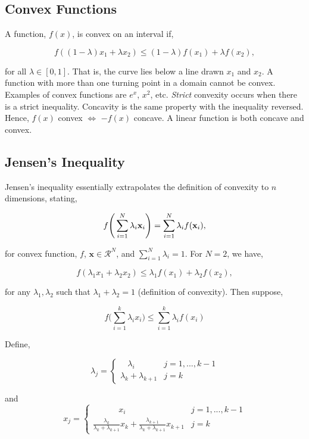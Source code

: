 \documentclass[11pt]{amsart}
\begin{document}
\subsection{Convex Functions}

A function, $f(x)$, is convex on an interval if,

$$
f((1 - \lambda)x_1 + \lambda x_2) \leq (1 - \lambda) f(x_1) + \lambda f(x_2),
$$

for all $\lambda \in [0, 1]$. That is, the curve lies below a line drawn $x_1$ and $x_2$. A function with more than one turning point in a domain cannot be convex. Examples of convex functions are $e^x$, $x^2$, etc. \emph{Strict} convexity occurs when there is a strict inequality. Concavity is the same property with the inequality reversed. Hence, $f(x)$ convex $\Longleftrightarrow$ $-f(x)$ concave. A linear function is both concave and convex.

\subsection{Jensen's Inequality}

Jensen's inequality essentially extrapolates the definition of convexity to $n$ dimensions, stating,

$$
f\Bigg(\sum_{i=1}^{N}\lambda_i \mathbf{x}_i\Bigg) = \sum_{i=1}^{N} \lambda_if(\mathbf{x}_i) \notag,
$$

for convex function, $f$, $\mathbf{x} \in \mathcal{R}^N$, and $\sum_{i=1}^N \lambda_i = 1$. For $N = 2$, we have,

$$
f(\lambda_1 x_1 + \lambda_2 x_2) \leq \lambda_1f(x_1) + \lambda_2f(x_2),
$$

for any $\lambda_1, \lambda_2$ such that $\lambda_1 + \lambda_2 = 1$ (definition of convexity). Then suppose,

$$
f\Bigg(\sum_{i=1}^k\lambda_i x_i\Bigg) \leq \sum_{i=1}^k \lambda_if(x_i)
$$

Define,

\[\lambda_j = \begin{cases} 
      \ \ \ \ \lambda_i & j = 1, ..., k-1 \\
      \lambda_k + \lambda_{k+1} & j = k
   \end{cases}
\]

and \[x_j = \begin{cases} 
      \ \ \ \ \ \ \ \ \ \ \ \ \ \  x_i & j = 1, ..., k-1 \\
      \frac{\lambda_k}{\lambda_k + \lambda_{k+1}}x_k + \frac{\lambda_{k+1}}{\lambda_k + \lambda_{k+1}}x_{k+1} & j = k
   \end{cases}
\]
\end{document}
